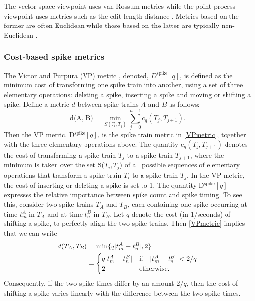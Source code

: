 The vector space viewpoint uses van Rossum metrics while the point-process viewpoint uses metrics such as the edit-length distance \cite{Victor2005}. 
Metrics based on the former are often Euclidean while those based on the latter are typically non-Euclidean \cite{Aronov2004}.\\


\subsubsection{Cost-based spike metrics}
The Victor and Purpura (VP) metric \cite{Victor1996, Victor1998}, denoted, 
$D^{\text{spike}}[q]$, is defined as the minimum cost of transforming one spike
train into another, using a set of three elementary operations:
deleting a spike, inserting a spike and moving or shifting a spike. Define a metric $d$ between spike trains $A$ and $B$ as follows:
\begin{equation}\label{VPmetric}
\text{d(A, B)} = \displaystyle \min_{S(T_{i}, T_{j})} \sum_{j=0}^{n-1} c_{q}(T_{j}, T_{j+1}). 
\end{equation} 
Then the VP metric, D$^{\text{spike}}[q]$, is the spike train metric in \eqref{VPmetric}, together with the three elementary operations above.
The quantity c$_{q}(T_{j}, T_{j+1})$ denotes the cost of transforming a spike train $T_{j}$ to a spike train $T_{j+1}$, where the minimum is taken over the set S($T_{i}, T_{j}$) of all possible sequences of elementary operations that transform a spike train $T_{i}$ to a spike train $T_{j}$.
In the VP metric, the cost of inserting or deleting a spike is set to 1.
The quantity D$^{\text{spike}}[q]$ expresses the relative importance between
spike count and spike timing.
To see this, consider two spike trains $T_{A}$ and $T_{B}$, each containing 
one spike occurring at time $t_{m}^{A}$ in $T_{A}$ and at time $t_{n}^{B}$ in $T_{B}$. Let $q$ denote the cost (in 1/seconds) of shifting a spike, to perfectly align the two spike trains.
Then \eqref{VPmetric} implies that we can write 
\begin{align*}
d(T_{A}, T_{B}) &= \displaystyle \min \{ q\lvert t_{m}^{A} - t_{n}^{B}\rvert,  2 \}\\
  &= \begin{cases} 
       q\lvert t_{m}^{A} - t_{n}^{B}\rvert & \text{if} \quad  \lvert t_{m}^{A} - t_{n}^{B}\rvert < 2/q \\
2 & \text{otherwise}.        
\end{cases}
\end{align*}
Consequently, if the two spike times differ by an amount $2/q$, then the cost of shifting a spike varies linearly with the difference between the two spike times.
